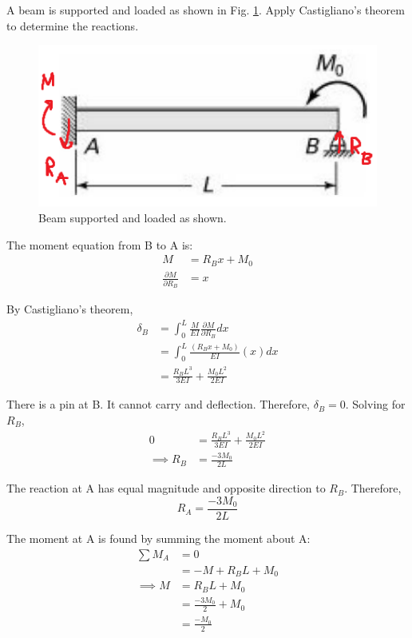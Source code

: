 \section{}
A beam is supported and loaded as shown in Fig. \ref{fig:Q2ProblemDiagram}. Apply Castigliano's theorem to determine the
reactions.

\begin{figure}[h]
    \centering
    \includegraphics[width=0.5\linewidth]{Questions/Figures/Q2ProblemDiagram.png}
    \caption{Beam supported and loaded as shown.}
    \label{fig:Q2ProblemDiagram}
\end{figure}

The moment equation from B to A is:
\begin{align*}
    M &= R_B x + M_0 \\
    \frac{\partial M}{\partial R_B} &= x 
\end{align*}

By Castigliano's theorem,
\begin{align*}
    \delta_{B} &= \int_{0}^{L} \frac{M}{EI} \frac{\partial M}{\partial R_B} dx \\
    &= \int_{0}^{L} \frac{(R_B x + M_0)}{EI} (x) dx \\
    &= \frac{R_B L^3}{3EI} + \frac{M_0 L^2}{2EI} 
\end{align*}

There is a pin at B. It cannot carry and deflection. Therefore, $\delta_B = 0$. Solving for $R_B$,
\begin{align*}
    0 &= \frac{R_B L^3}{3EI} + \frac{M_0 L^2}{2EI} \\
    \implies R_B &= \frac{-3M_0}{2L} 
\end{align*}

The reaction at A has equal magnitude and opposite direction to $R_B$. Therefore,
\begin{equation*}
    \boxed{R_A = \frac{-3M_0}{2L}}
\end{equation*}

The moment at A is found by summing the moment about A:
\begin{align*}
    \sum M_A &= 0 \\
    &= -M + R_B L + M_0 \\
    \implies M &= R_B L + M_0 \\
    &= \frac{-3M_0}{2} + M_0 \\
    &= \boxed{\frac{-M_0}{2}} 
\end{align*}